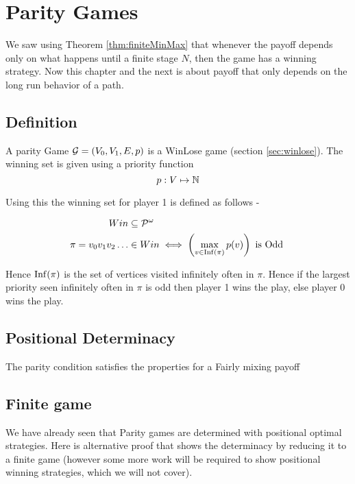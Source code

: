 \chapter{Parity Games}

We saw using Theorem \ref{thm:finiteMinMax} that whenever the payoff depends only on what happens until a finite stage $N$, then the game has a winning strategy. Now this chapter and the next is about payoff that only depends on the long run behavior of a path.

\section{Definition}
A parity Game $\mathcal{G}=(V_0,V_1,E,p)$ is a WinLose game (section \ref{sec:winlose}). The winning set is given using a priority function 
\begin{equation}
    p : V \mapsto \mathbb{N} \label{eq:priority}
\end{equation}

Using this the winning set for player 1 is defined as follows -

\begin{align}
    Win &\subseteq \mathcal{P}^\omega \nonumber \\
    \pi = v_0v_1v_2 \ldots &\in Win \iff \left(\max_{v \in \operatorname*{Inf}(\pi)} p(v)\right) \text{ is Odd } \label{cond:parity}
\end{align}

Hence $\operatorname*{Inf}(\pi)$ is the set of vertices visited infinitely often in $\pi$.
Hence if the largest priority seen infinitely often in $\pi$ is odd then player 1 wins the play, else player 0 wins the play.

\section{Positional Determinacy}
The parity condition satisfies the properties for a Fairly mixing payoff

\section{Finite game}
\label{sec:parityFiniteGame}
We have already seen that Parity games are determined with positional optimal strategies. Here is alternative proof that shows the determinacy by reducing it to a finite game (however some more work will be required to show positional winning strategies, which we will not cover).

